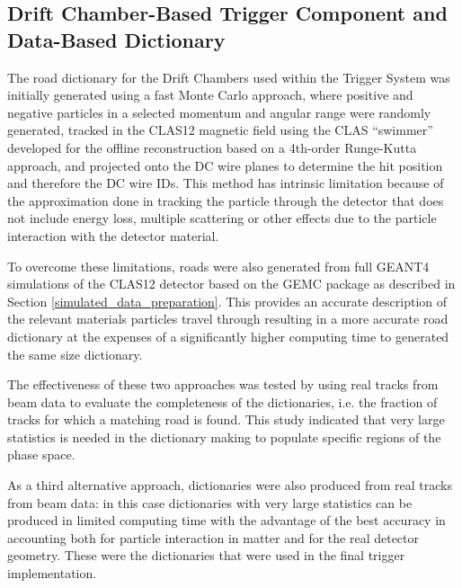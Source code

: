 
\subsection{Drift Chamber-Based Trigger Component and Data-Based Dictionary}
\label{dc_dictionary}

The road dictionary for the Drift Chambers used within the Trigger System was initially generated using a fast Monte Carlo approach, where positive and negative particles in a selected momentum and angular range were randomly generated, tracked in the CLAS12 magnetic field using the CLAS ``swimmer'' developed for the offline reconstruction based on a 4th-order Runge-Kutta approach, and projected onto the DC wire planes to determine the hit position and therefore the DC wire IDs. This method has intrinsic limitation because of the approximation done in tracking the particle through the detector that does not include energy loss, multiple scattering or other effects due to the particle interaction with the detector material.

To overcome these limitations, roads were also generated from full GEANT4 simulations of the CLAS12 detector based on the GEMC package as described in Section \ref{simulated_data_preparation}. This provides an accurate description of the relevant materials particles travel through resulting in a more accurate road dictionary at the expenses of a significantly higher computing time to generated the same size dictionary.

The effectiveness of these two approaches was tested by using real tracks from beam data to evaluate the completeness of the dictionaries, i.e. the fraction of tracks for which a matching road is found. This study indicated that very large statistics is needed in the dictionary making to populate specific regions of the phase space.

As a third alternative approach, dictionaries were also produced from real tracks from beam data: in this case dictionaries with very large statistics can be produced in limited computing time with the advantage of the best accuracy in accounting both for particle interaction in matter and for the real detector geometry. These were the dictionaries that were used in the final trigger implementation.

